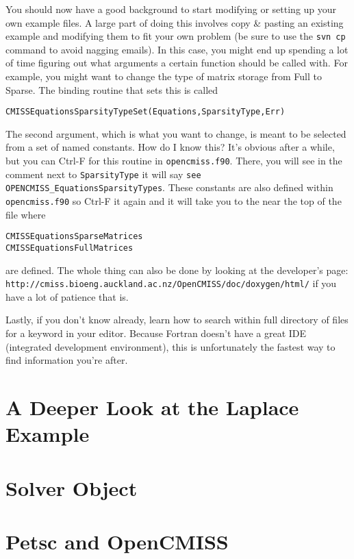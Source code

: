 You should now have a good background to start modifying or setting up your own example files. 
A large part of doing this involves copy \& pasting an existing example and modifying them to fit
your own problem (be sure to use the \texttt{svn cp} command to avoid nagging emails). In this case,
you might end up spending a lot of time figuring out what arguments a certain function should be called 
with. For example, you might want to change the type of matrix storage from Full to Sparse. The 
binding routine that sets this is called
\begin{lstlisting}
CMISSEquationsSparsityTypeSet(Equations,SparsityType,Err)
\end{lstlisting}
The second argument, which is what you want to change, is meant to be selected from a set of named
constants. How do I know this? It's obvious after a while, but you can Ctrl-F for this routine in 
\texttt{opencmiss.f90}. There, you will see in the comment next to \texttt{SparsityType} it will say
\texttt{see OPENCMISS\_EquationsSparsityTypes}. These constants are also defined within 
\texttt{opencmiss.f90} so Ctrl-F it again and it will take you to the near the top of the file where
\begin{lstlisting}
CMISSEquationsSparseMatrices
CMISSEquationsFullMatrices
\end{lstlisting}
are defined. The whole thing can also be done by looking at the developer's page:\\
\texttt{http://cmiss.bioeng.auckland.ac.nz/OpenCMISS/doc/doxygen/html/}
if you have a lot of patience that is.

Lastly, if you don't know already, learn how to search within full directory of files for a keyword 
in your editor. Because Fortran doesn't have a great IDE (integrated development environment), this
is unfortunately the fastest way to find information you're after.


\section{A Deeper Look at the Laplace Example}
\label{sec:devel_laplace}

\section{Solver Object}
\label{sec:devel_solver}

\section{Petsc and OpenCMISS}
\label{sec:devel_petsc}

